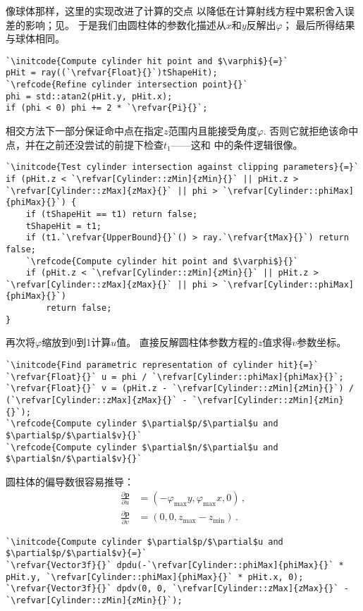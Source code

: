 像球体那样，这里的实现改进了计算的交点
以降低在计算射线方程中累积舍入误差的影响；见。
于是我们由圆柱体的参数化描述从$x$和$y$反解出$\varphi$；
最后所得结果与球体相同。
\begin{lstlisting}
`\initcode{Compute cylinder hit point and $\varphi$}{=}`
pHit = ray((`\refvar{Float}{}`)tShapeHit);
`\refcode{Refine cylinder intersection point}{}`
phi = std::atan2(pHit.y, pHit.x);
if (phi < 0) phi += 2 * `\refvar{Pi}{}`;
\end{lstlisting}

相交方法下一部分保证命中点在指定$z$范围内且能接受角度$\varphi$.
否则它就拒绝该命中点，并在之前还没尝试的前提下检查$t_1$——这和
中的条件逻辑很像。
\begin{lstlisting}
`\initcode{Test cylinder intersection against clipping parameters}{=}`
if (pHit.z < `\refvar[Cylinder::zMin]{zMin}{}` || pHit.z > `\refvar[Cylinder::zMax]{zMax}{}` || phi > `\refvar[Cylinder::phiMax]{phiMax}{}`) {
    if (tShapeHit == t1) return false;
    tShapeHit = t1;
    if (t1.`\refvar{UpperBound}{}`() > ray.`\refvar{tMax}{}`) return false;
    `\refcode{Compute cylinder hit point and $\varphi$}{}`
    if (pHit.z < `\refvar[Cylinder::zMin]{zMin}{}` || pHit.z > `\refvar[Cylinder::zMax]{zMax}{}` || phi > `\refvar[Cylinder::phiMax]{phiMax}{}`)
        return false;
}
\end{lstlisting}

再次将$\varphi$缩放到0到1计算$u$值。
直接反解圆柱体参数方程的$z$值求得$v$参数坐标。
\begin{lstlisting}
`\initcode{Find parametric representation of cylinder hit}{=}`
`\refvar{Float}{}` u = phi / `\refvar[Cylinder::phiMax]{phiMax}{}`;
`\refvar{Float}{}` v = (pHit.z - `\refvar[Cylinder::zMin]{zMin}{}`) / (`\refvar[Cylinder::zMax]{zMax}{}` - `\refvar[Cylinder::zMin]{zMin}{}`);
`\refcode{Compute cylinder $\partial$p/$\partial$u and $\partial$p/$\partial$v}{}`
`\refcode{Compute cylinder $\partial$n/$\partial$u and $\partial$n/$\partial$v}{}`
\end{lstlisting}

圆柱体的偏导数很容易推导：
\begin{align*}
    \frac{\partial\bm p}{\partial u} & =(-\varphi_{\max}y,\varphi_{\max}x,0)\, , \\
    \frac{\partial\bm p}{\partial v} & =(0,0,z_{\max}-z_{\min})\, .
\end{align*}
\begin{lstlisting}
`\initcode{Compute cylinder $\partial$p/$\partial$u and $\partial$p/$\partial$v}{=}`
`\refvar{Vector3f}{}` dpdu(-`\refvar[Cylinder::phiMax]{phiMax}{}` * pHit.y, `\refvar[Cylinder::phiMax]{phiMax}{}` * pHit.x, 0);
`\refvar{Vector3f}{}` dpdv(0, 0, `\refvar[Cylinder::zMax]{zMax}{}` - `\refvar[Cylinder::zMin]{zMin}{}`);
\end{lstlisting}

